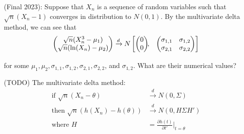\documentclass[answers]{exam}
\begin{document}
\begin{questions}
\begin{solution}
\end{solution} 

\question (Final 2023): Suppose that $X_n$ is a sequence of random variables such that $\sqrt{n}(X_n-1)$ converges in distribution to $N(0,1)$. By the multivariate delta method, we can see that
\begin{align*}
    \begin{pmatrix}
    \sqrt{n}(X_n^3-\mu_1)\\
    \sqrt{n}(\ln(X_n) - \mu_2)\\
    \end{pmatrix} 
    &\xrightarrow{d}  N
    \begin{bmatrix}
    \begin{pmatrix}
    0\\
    0
    \end{pmatrix}\!\!,&
    \begin{pmatrix}
    \sigma_{1,1} & \sigma_{1,2}\\
    \sigma_{2,1} & \sigma_{2,2}
    \end{pmatrix}
    \end{bmatrix}\\[2\jot]
    \end{align*}
for some $\mu_1, \mu_2, \sigma_{1,1}, \sigma_{1,2}, \sigma_{2,1}, \sigma_{2,2}$, and $\sigma_{1,2}$. What are their numerical values?
\begin{solution}
    (TODO)
    The multivariate delta method:
    \begin{align*}
        \text{if } \sqrt{n}(X_n - \theta) &\xrightarrow{d} N(0, \Sigma)\\
        \text{then } \sqrt{n}(h(X_n) - h(\theta)) &\xrightarrow{d} N(0, H \Sigma H')\\
        \text{where } H &= \frac{\partial  h(t)}{\partial t'} \bigg|_{t=\theta}
    \end{align*}

    
\end{solution}


\end{questions}
\end{document}
